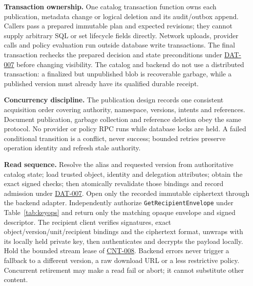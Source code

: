 \documentclass[11pt,a4paper]{article}
\newcommand{\code}[1]{{\small\nolinkurl{#1}}}
\newcommand{\rr}[1]{\hyperlink{req:#1}{#1}}
\begin{document}
\textbf{Transaction ownership.} One catalog transaction function owns each publication, metadata change or logical deletion and its audit/outbox append. Callers pass a prepared immutable plan and expected revisions; they cannot supply arbitrary SQL or set lifecycle fields directly. Network uploads, provider calls and policy evaluation run outside database write transactions. The final transaction rechecks the prepared decision and state preconditions under \rr{DAT-007} before changing visibility. The catalog and backend do not use a distributed transaction: a finalized but unpublished blob is recoverable garbage, while a published version must already have its qualified durable receipt.

\textbf{Concurrency discipline.} The publication design records one consistent acquisition order covering authority, namespace, versions, intents and references. Document publication, garbage collection and reference deletion obey the same protocol. No provider or policy RPC runs while database locks are held. A failed conditional transition is a conflict, never success; bounded retries preserve operation identity and refresh stale authority.

\textbf{Read sequence.} Resolve the alias and requested version from authoritative catalog state; load trusted object, identity and delegation attributes; obtain the exact signed checks; then atomically revalidate those bindings and record admission under \rr{DAT-007}. Open only the recorded immutable ciphertext through the backend adapter. Independently authorize \code{GetRecipientEnvelope} under Table~\ref{tab:keyops} and return only the matching opaque envelope and signed descriptor. The recipient client verifies signatures, exact object/version/unit/recipient bindings and the ciphertext format, unwraps with its locally held private key, then authenticates and decrypts the payload locally. Hold the bounded stream lease of \rr{CNT-008}. Backend errors never trigger a fallback to a different version, a raw download URL or a less restrictive policy. Concurrent retirement may make a read fail or abort; it cannot substitute other content.
\end{document}
